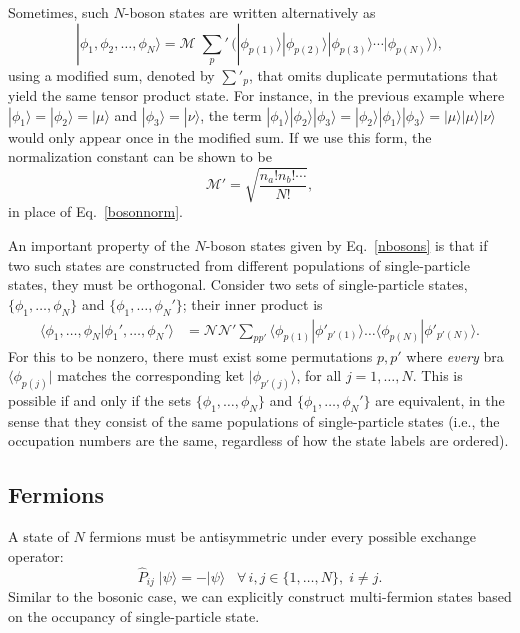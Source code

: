 \documentclass[pra,12pt]{revtex4-2}
\begin{document}
Sometimes, such $N$-boson states are written alternatively as
\begin{equation}
  |\phi_1,\phi_2,\dots,\phi_N\rangle = \mathcal{M} \; {\sum_p}'\,
  \Big(|\phi_{p(1)}\rangle  |\phi_{p(2)}\rangle  |\phi_{p(3)}\rangle  \cdots
  |\phi_{p(N)}\rangle\Big),
  \label{nbosons2}
\end{equation}
using a modified sum, denoted by $\sum'_p$, that omits duplicate
permutations that yield the same tensor product state.  For instance,
in the previous example where $|\phi_1\rangle = |\phi_2\rangle =
|\mu\rangle$ and $|\phi_3\rangle = |\nu\rangle$, the term $|\phi_1
\rangle |\phi_2 \rangle |\phi_3 \rangle = |\phi_2 \rangle |\phi_1
\rangle |\phi_3 \rangle = |\mu \rangle |\mu \rangle |\nu \rangle$
would only appear once in the modified sum.  If we use this form, the
normalization constant can be shown to be
\begin{equation}
  \mathcal{M}' = \sqrt{\frac{n_a!n_b!\cdots}{N!}},
\end{equation}
in place of Eq.~\eqref{bosonnorm}.

An important property of the $N$-boson states given by
Eq.~\eqref{nbosons} is that if two such states are constructed from
different populations of single-particle states, they must be
orthogonal.  Consider two sets of single-particle states,
$\{\phi_1,\dots,\phi_N\}$ and $\{\phi_1,\dots,\phi_N'\}$; their inner
product is
\begin{align}
  \langle \phi_1, \dots, \phi_N | \phi_1',\dots, \phi_N'\rangle
  &= \mathcal{NN'}
  \sum_{pp'} \langle \phi_{p(1)} | \phi'_{p'(1)}\rangle \dots
  \langle \phi_{p(N)} | \phi'_{p'(N)}\rangle.
  \label{bosorthog}
\end{align}
For this to be nonzero, there must exist some permutations $p, p'$
where \textit{every} bra $\langle \phi_{p(j)}|$ matches the
corresponding ket $|\phi_{p'(j)}\rangle$, for all $j = 1, \dots, N$.
This is possible if and only if the sets $\{\phi_1,\dots,\phi_N\}$ and
$\{\phi_1,\dots,\phi_N'\}$ are equivalent, in the sense that they
consist of the same populations of single-particle states (i.e., the
occupation numbers are the same, regardless of how the state labels
are ordered).

\subsection{Fermions}
\label{sec:fermions}

A state of $N$ fermions must be antisymmetric under every possible
exchange operator:
\begin{equation}
  \hat{P}_{ij}\; |\psi\rangle = -|\psi\rangle \;\;\; \forall\, i,j\in\{1,\dots,N\}, \; i\ne j.
\end{equation}
Similar to the bosonic case, we can explicitly construct multi-fermion
states based on the occupancy of single-particle state.
\end{document}
